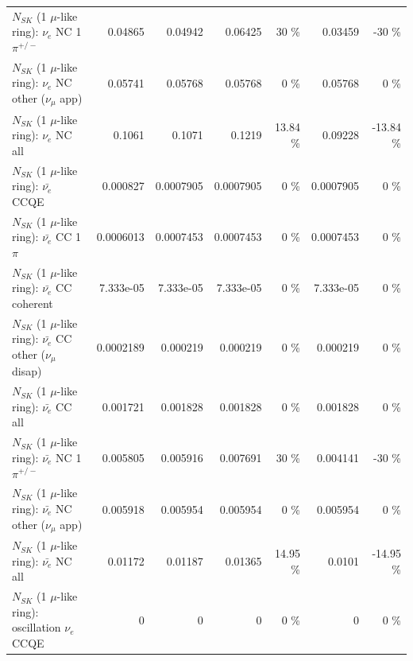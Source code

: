 \begin{table}
\begin{tabular}{| l | r | r | r  r | r  r |}
\hline
                           $N_{SK}$ (1 $\mu$-like ring): $\nu_e$ NC 1$\pi^{+/-}$ &         0.04865 &         0.04942 &         0.06425 &       30 \%  &         0.03459 &      -30 \%  \\ 
                  $N_{SK}$ (1 $\mu$-like ring): $\nu_e$ NC other ($\nu_\mu$ app) &         0.05741 &         0.05768 &         0.05768 &        0 \%  &         0.05768 &        0 \%  \\ 
                                  $N_{SK}$ (1 $\mu$-like ring): $\nu_{e}$ NC all &          0.1061 &          0.1071 &          0.1219 &    13.84 \%  &         0.09228 &   -13.84 \%  \\ 
\hline
\hline
\hline
                                $N_{SK}$ (1 $\mu$-like ring): $\bar{\nu_e}$ CCQE &        0.000827 &       0.0007905 &       0.0007905 &        0 \%  &       0.0007905 &        0 \%  \\ 
                           $N_{SK}$ (1 $\mu$-like ring): $\bar{\nu_e}$ CC 1$\pi$ &       0.0006013 &       0.0007453 &       0.0007453 &        0 \%  &       0.0007453 &        0 \%  \\ 
                         $N_{SK}$ (1 $\mu$-like ring): $\bar{\nu_e}$ CC coherent &       7.333e-05 &       7.333e-05 &       7.333e-05 &        0 \%  &       7.333e-05 &        0 \%  \\ 
          $N_{SK}$ (1 $\mu$-like ring): $\bar{\nu_e}$ CC other ($\nu_\mu$ disap) &       0.0002189 &        0.000219 &        0.000219 &        0 \%  &        0.000219 &        0 \%  \\ 
                            $N_{SK}$ (1 $\mu$-like ring): $\bar{\nu_{e}}$ CC all &        0.001721 &        0.001828 &        0.001828 &        0 \%  &        0.001828 &        0 \%  \\ 
\hline
                     $N_{SK}$ (1 $\mu$-like ring): $\bar{\nu_e}$ NC 1$\pi^{+/-}$ &        0.005805 &        0.005916 &        0.007691 &       30 \%  &        0.004141 &      -30 \%  \\ 
            $N_{SK}$ (1 $\mu$-like ring): $\bar{\nu_e}$ NC other ($\nu_\mu$ app) &        0.005918 &        0.005954 &        0.005954 &        0 \%  &        0.005954 &        0 \%  \\ 
                            $N_{SK}$ (1 $\mu$-like ring): $\bar{\nu_{e}}$ NC all &         0.01172 &         0.01187 &         0.01365 &    14.95 \%  &          0.0101 &   -14.95 \%  \\ 
\hline
\hline
\hline
                          $N_{SK}$ (1 $\mu$-like ring): oscillation $\nu_e$ CCQE &               0 &               0 &               0 &        0 \%  &               0 &        0 \%  \\ 

\end{tabular}
\end{table}
